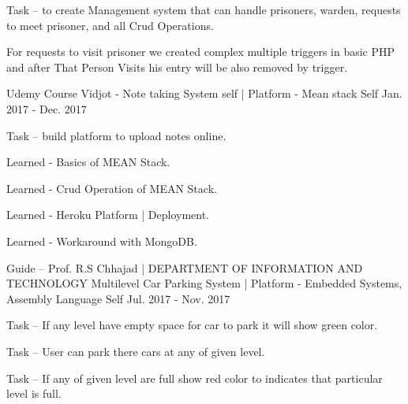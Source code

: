 \begin{cventries}
{\begin{cvitems}
        \item {Task – to create Management system that can handle prisoners, warden, requests to meet prisoner, and all Crud Operations.}
        \item {For requests to visit prisoner we created complex multiple triggers in basic PHP and after That Person Visits his entry will be also removed by trigger.}
      \end{cvitems} 
    }
  \cventry
    {Udemy Course}
    {Vidjot - Note taking System  self | Platform - Mean stack}
    {Self}
    {Jan. 2017 - Dec. 2017}
    {
      \begin{cvitems}
                \item {Task – build platform to upload notes online.}
                \item {Learned - Basics of MEAN Stack.}
                \item {Learned - Crud Operation of MEAN Stack.}
                \item {Learned - Heroku Platform | Deployment.}
                \item {Learned - Workaround with MongoDB.}
            \end{cvitems}
    }  
  \cventry
    {Guide – Prof. R.S Chhajad | DEPARTMENT OF INFORMATION AND TECHNOLOGY}
    {Multilevel Car Parking System | Platform - Embedded Systems, Assembly Language}
    {Self}
    {Jul. 2017 - Nov. 2017}
    {
      \begin{cvitems}
        \item {Task – If any level have empty space for car to park it will show green color. }
        \item {Task – User can park there cars at any of given level. }
        \item {Task – If any of given level are full show red color to indicates that particular level is full.}
      \end{cvitems}
    }
\end{cventries}
